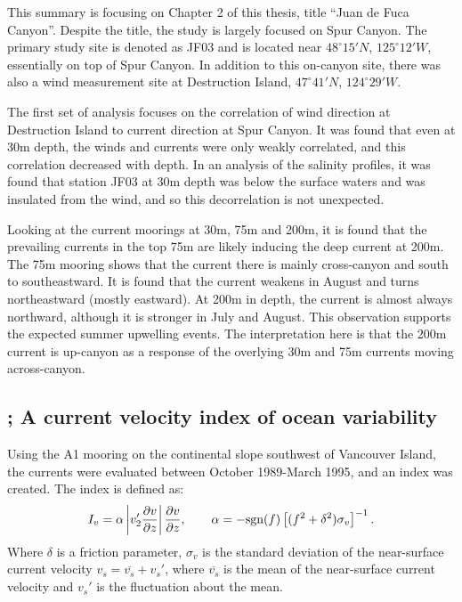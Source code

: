 \documentclass[12pt]{extreport}
\begin{document}
This summary is focusing on Chapter 2 of this thesis, title ``Juan de Fuca Canyon''. Despite the title, the study is largely focused on Spur Canyon. The primary study site is denoted as JF03 and is located near $48^\circ15' N$, $125^\circ 12' W$, essentially on top of Spur Canyon. In addition to this on-canyon site, there was also a wind measurement site at Destruction Island, $47^\circ 41' N$, $124^\circ 29' W$.

The first set of analysis focuses on the correlation of wind direction at Destruction Island to current direction at Spur Canyon. It was found that even at 30m depth, the winds and currents were only weakly correlated, and this correlation decreased with depth. In an analysis of the salinity profiles, it was found that station JF03 at 30m depth was below the surface waters and was insulated from the wind, and so this decorrelation is not unexpected.

Looking at the current moorings at 30m, 75m and 200m, it is found that the prevailing currents in the top 75m are likely inducing the deep current at 200m. The 75m mooring shows that the current there is mainly cross-canyon and south to southeastward. It is found that the current weakens in August and turns northeastward (mostly eastward). At 200m in depth, the current is almost always northward, although it is stronger in July and August. This observation supports the expected summer upwelling events. The interpretation here is that the 200m current is up-canyon as a response of the overlying 30m and 75m currents moving across-canyon.

\subsection{\cite{thomson1996current}; A current velocity index of ocean variability}

Using the A1 mooring on the continental slope southwest of Vancouver Island, the currents were evaluated between October 1989-March 1995, and an index was created. 
The index is defined as:
\begin{align}
 I_v = \alpha \left| v_2' \frac{\partial v}{\partial z} \right| \frac{\partial v}{\partial z}, \qquad \alpha = -\hbox{sgn} (f) \left[ (f^2 + \delta^2) \sigma_v \right]^{-1}.
\end{align}
Where $\delta$ is a friction parameter, $\sigma_v$ is the standard deviation of the near-surface current velocity $v_s= \overline{v_s} + v_s'$, where $\overline{v_s}$ is the mean of the near-surface current velocity and $v_s'$ is the fluctuation about the mean.
\end{document}

